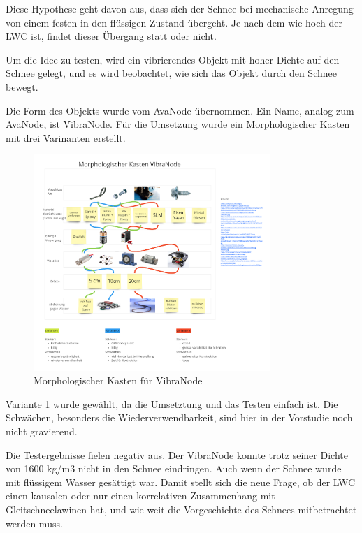 
Diese Hypothese geht davon aus, dass sich der Schnee bei mechanische Anregung von einem festen in den flüssigen Zustand übergeht. Je nach dem wie hoch der LWC ist, findet dieser Übergang statt oder nicht.

Um die Idee zu testen, wird ein vibrierendes Objekt mit hoher Dichte auf den Schnee gelegt, und es wird beobachtet, wie sich das Objekt durch den Schnee bewegt.

Die Form des Objekts wurde vom AvaNode übernommen.  Ein Name, analog zum AvaNode, ist VibraNode. Für die Umsetzung wurde ein Morphologischer Kasten mit drei Varinanten erstellt.


\begin{figure}[H]
    \centering
    \includegraphics[width=0.8\textwidth]{Bilder/Unbenann2t.PNG}
    \caption{Morphologischer Kasten für VibraNode}
    \label{fig:Bildverarbeitnugskonzpet}
\end{figure}


Variante 1 wurde gewählt, da die Umsetztung und das Testen einfach ist. Die Schwächen, besonders die Wiederverwendbarkeit, sind hier in der Vorstudie noch nicht gravierend.

Die Testergebnisse fielen negativ aus. Der VibraNode konnte trotz seiner Dichte von 1600 kg/m3 nicht in den Schnee eindringen. Auch wenn der Schnee wurde mit flüssigem Wasser gesättigt war. Damit  stellt sich die neue Frage, ob der LWC einen kausalen oder nur einen korrelativen Zusammenhang mit Gleitschneelawinen hat, und wie weit die Vorgeschichte des Schnees mitbetrachtet werden muss. \cite{Altman.2015}
